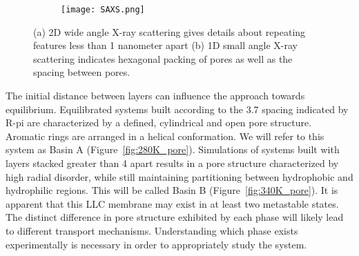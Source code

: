 \begin{figure}
	\centering
	\begin{subfigure}[t]{0.47\linewidth}
		\centering
		\caption{}\label{fig:WAXS}
	\end{subfigure}
	\begin{subfigure}[t]{0.43\linewidth}
		\centering
		\texttt{[image: SAXS.png]}
		\caption{}\label{fig:SAXS}
	\end{subfigure}
	\caption{(a) 2D wide angle X-ray scattering gives details about repeating features less than 1 nanometer apart (b) 1D small angle X-ray scattering indicates hexagonal packing of pores as well as the spacing between pores.}\label{fig:SWAXS}
\end{figure}

The initial distance between layers can influence the approach towards
equilibrium. Equilibrated systems built according to the 3.7 \angstrom 
spacing indicated by R-pi are characterized by a defined, cylindrical and
open pore structure. Aromatic rings are arranged in a helical conformation.
We will refer to this system as Basin A (Figure~\ref{fig:280K_pore}). Simulations
of systems built with layers stacked greater than 4 \angstrom apart results in a pore
structure characterized by high radial disorder, while still maintaining 
partitioning between hydrophobic and hydrophilic regions. This will be 
called Basin B (Figure~\ref{fig:340K_pore}). It is apparent that this LLC membrane
may exist in at least two metastable states. The distinct difference in 
pore structure exhibited by each phase will likely lead to different transport
mechanisms. Understanding which phase exists experimentally is necessary in 
order to appropriately study the system.

